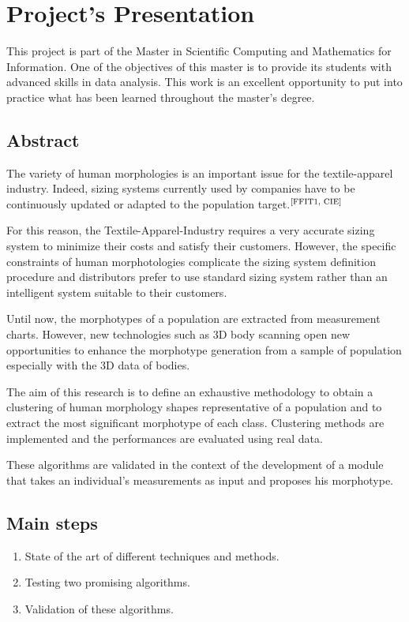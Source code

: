 \documentclass[12pt,a4paper,openany,UKenglish]{scrreprt}
\newcommand{\bib}[1]{$^\text{\cite{#1}}$}
\begin{document}

\tableofcontents

\chapter{Project's Presentation}
This project is part of the Master in Scientific Computing and Mathematics for Information.
One of the objectives of this master is to provide its students with advanced skills in data analysis.
This work is an excellent opportunity to put into practice what has been learned throughout the master's degree.

\section{Abstract}
The variety of human morphologies is an important issue for the textile-apparel industry.
Indeed, sizing systems currently used by companies have to be continuously updated or adapted to the population target.\bib{FFIT1, CIE}

For this reason, the Textile-Apparel-Industry requires a very accurate sizing system to minimize their costs and satisfy their customers.
However, the specific constraints of human morphotologies complicate the sizing system definition procedure and distributors prefer to use standard sizing system rather than an intelligent system suitable to their customers.

Until now, the morphotypes of a population are extracted from measurement charts.
However, new technologies such as 3D body scanning open new opportunities to enhance the morphotype generation from a sample of population especially with the 3D data of bodies.

The aim of this research is to define an exhaustive methodology to obtain a clustering of human morphology shapes representative of a population and to extract the most significant morphotype of each class.
Clustering methods are implemented and the performances are evaluated using real data.

These algorithms are validated in the context of the development of a module that takes an individual's measurements as input and proposes his morphotype.

\section{Main steps}
\begin{enumerate}[nolistsep]
	\item State of the art of different techniques and methods.
	\item Testing two promising algorithms.
	\item Validation of these algorithms.
\end{enumerate}
\end{document}
